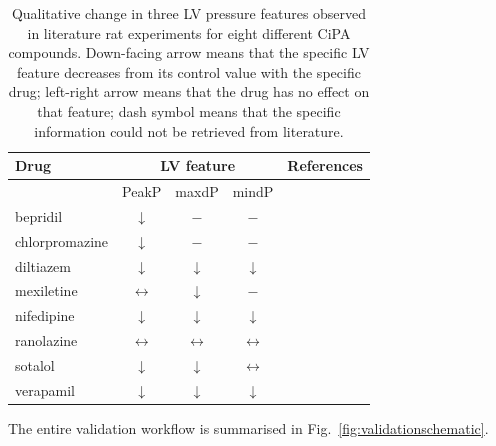 \begin{table}[!ht]
    \myfloatalign
    \begin{tabular}{lcccl}
    \hline
    \textbf{Drug}           & \multicolumn{3}{c}{\textbf{LV feature}} & \textbf{References} \\
    \hline
    & PeakP & maxdP & mindP & \\
    \hline
    bepridil       & $\downarrow$ & $-$ & $-$ & \cite{Leiris:1984, Amsterdam:1988, Huizer:1987} \\
    chlorpromazine & $\downarrow$ & $-$ & $-$ & \cite{Katsuoka:1989, Langslet:1971, Sakai:2017} \\
    diltiazem      & $\downarrow$ & $\downarrow$ & $\downarrow$ & \cite{Flaim:1982, Koltai:1989, Dong:1997} \\
    mexiletine     & $\leftrightarrow$ & $\downarrow$ & $-$ & \cite{Kamiyama:1995, Hesketh:2020, Marshall:1981} \\
    nifedipine     & $\downarrow$ & $\downarrow$ & $\downarrow$ & \cite{Dong:1997, Saponara:2007, Nishimura:1992} \\
    ranolazine     & $\leftrightarrow$ & $\leftrightarrow$ & $\leftrightarrow$ & \cite{Wang:2007, Hwang:2009, Wang:2019} \\
    sotalol        & $\downarrow$ & $\downarrow$ & $\leftrightarrow$ & \cite{Mackin:2019, Peralta:2000, Hoffmeister:1988} \\
    verapamil      & $\downarrow$ & $\downarrow$ & $\downarrow$ & \cite{Simonovic:2019, Stojic:2017, Kolar:1990} \\
    \hline
    \end{tabular}
    \caption{Qualitative change in three LV pressure features observed in literature rat experiments for eight different CiPA compounds. Down-facing arrow means that the specific LV feature decreases from its control value with the specific drug; left-right arrow means that the drug has no effect on that feature; dash symbol means that the specific information could not be retrieved from literature.}
    \label{tab:drugvalidationrefs}
\end{table}

\noindent
The entire validation workflow is summarised in Fig.~\ref{fig:validationschematic}.

